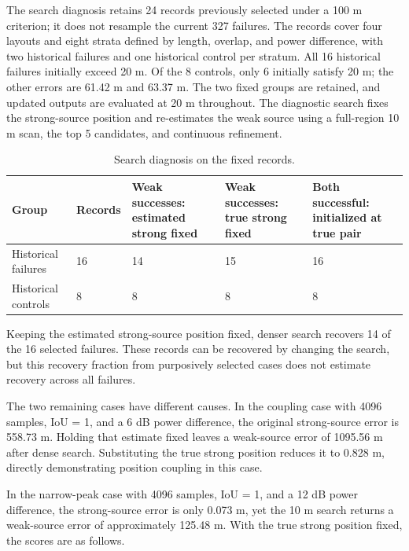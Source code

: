 \documentclass[11pt,a4paper]{article}
\numberwithin{equation}{section}
\numberwithin{figure}{section}
\numberwithin{table}{section}
\begin{document}
The search diagnosis retains 24 records previously selected under a 100 m criterion; it does not resample the current 327 failures. The records cover four layouts and eight strata defined by length, overlap, and power difference, with two historical failures and one historical control per stratum. All 16 historical failures initially exceed 20 m. Of the 8 controls, only 6 initially satisfy 20 m; the other errors are 61.42 m and 63.37 m. The two fixed groups are retained, and updated outputs are evaluated at 20 m throughout. The diagnostic search fixes the strong-source position and re-estimates the weak source using a full-region 10 m scan, the top 5 candidates, and continuous refinement.

\begin{table}[H]
\centering
\caption{Search diagnosis on the fixed records.}\label{tab:3.6}
\small
\setlength{\tabcolsep}{4pt}
\renewcommand{\arraystretch}{1.2}
\begin{tabularx}{\linewidth}{Y{1}Y{0.6}Y{1.15}Y{1.1}Y{1.15}}
\toprule
\textbf{Group} & \textbf{Records} & \textbf{Weak successes: estimated strong fixed} & \textbf{Weak successes: true strong fixed} & \textbf{Both successful: initialized at true pair} \\
\midrule
Historical failures & 16 & 14 & 15 & 16 \\
Historical controls & 8 & 8 & 8 & 8 \\
\bottomrule
\end{tabularx}
\end{table}

Keeping the estimated strong-source position fixed, denser search recovers 14 of the 16 selected failures. These records can be recovered by changing the search, but this recovery fraction from purposively selected cases does not estimate recovery across all failures.

The two remaining cases have different causes. In the coupling case with 4096 samples, IoU = 1, and a 6 dB power difference, the original strong-source error is 558.73 m. Holding that estimate fixed leaves a weak-source error of 1095.56 m after dense search. Substituting the true strong position reduces it to 0.828 m, directly demonstrating position coupling in this case.

In the narrow-peak case with 4096 samples, IoU = 1, and a 12 dB power difference, the strong-source error is only 0.073 m, yet the 10 m search returns a weak-source error of approximately 125.48 m. With the true strong position fixed, the scores are as follows.
\end{document}
